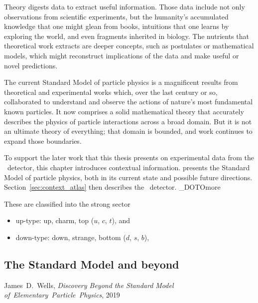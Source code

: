Theory digests data to extract useful information.
Those data include not only observations from scientific experiments,
but the humanity's accumulated knowledge that one might glean from books,
intuitions that one learns by exploring the world,
and even fragments inherited in biology.
The nutrients that theoretical work extracts are deeper concepts,
such as postulates or mathematical models,
which might reconstruct implications of the data and make useful or novel
predictions.

The current Standard Model of particle physics is a magnificent results from
theoretical and experimental works which, over the last century or
so, collaborated to understand and observe the actions of nature's most
fundamental known particles.
It now comprises a solid mathematical theory that accurately describes the
physics of particle interactions across a broad domain.
But it is not an ultimate theory of everything; that domain is bounded, and
work continues to expand those boundaries.

To support the later work that this thesis presents on experimental data from
the \atlas\ detector, this chapter introduces contextual information.
 presents the Standard Model of particle
physics, both in its current state and possible future directions.
Section~\ref{sec:context_atlas} then describes the \atlas\ detector.
\NO_DOTO{more}


These are classified into the strong sector
\begin{itemize}
\item up-type: up, charm, top ($u$, $c$, $t$), and
\item down-type: down, strange, bottom ($d$, $s$, $b$),
\end{itemize}


\begin{singlespacing}
\section{The Standard Model and beyond}
\label{sec:context_sm_and_beyond}
%
\begin{epigraphs}
%
{James~D.~Wells,
\textit{Discovery Beyond the Standard Model of~Elementary~Particle~Physics},
2019~\cite{wells2020discovery}}
\end{epigraphs}
\end{singlespacing}


